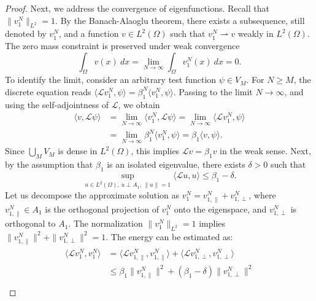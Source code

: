 \documentclass[11pt, a4paper]{article}
\theoremstyle{break}
\theoremstyle{break}
\theoremstyle{break}
\theoremstyle{break}
\theoremstyle{break}
\theoremstyle{break}
\theoremstyle{break}
\theoremstyle{break}
\theoremstyle{break}
\theoremstyle{break}
\begin{document}
\begin{proof}
    Next, we address the convergence of eigenfunctions. Recall that $\|v_1^N\|_{L^2} = 1$. By the Banach-Alaoglu theorem, there exists a subsequence, still denoted by $v_1^N$, and a function $v \in L^2(\Omega)$ such that $v_1^N \rightharpoonup v$ weakly in $L^2(\Omega)$. The zero mass constraint is preserved under weak convergence
    \begin{equation}
        \int_\Omega v(x) \:dx = \lim_{N \to \infty} \int_\Omega v_1^N(x) \:dx = 0.
    \end{equation}
    To identify the limit, consider an arbitrary test function $\psi \in V_M$. For $N \geq M$, the discrete equation reads $\langle \mathcal{L} v_1^N, \psi \rangle = \beta_1^N \langle v_1^N, \psi \rangle$. Passing to the limit $N \to \infty$, and using the self-adjointness of $\mathcal{L}$, we obtain
    \begin{align}
        \langle v, \mathcal{L} \psi \rangle &= \lim_{N \to \infty} \langle v_1^N, \mathcal{L} \psi \rangle = \lim_{N \to \infty} \langle \mathcal{L} v_1^N, \psi \rangle \\
        &= \lim_{N \to \infty} \beta_1^N \langle v_1^N, \psi \rangle = \beta_1 \langle v, \psi \rangle.
    \end{align}
    Since $\bigcup_{M} V_M$ is dense in $L^2(\Omega)$, this implies $\mathcal{L} v = \beta_1 v$ in the weak sense.
    Next, by the assumption that $\beta_1$ is an isolated eigenvalue, there exists $\delta > 0$ such that
    \begin{equation}
        \sup_{u \in L^2(\Omega), \, u \perp A_1, \, \|u\|=1} \langle \mathcal{L} u, u \rangle \leq \beta_1 - \delta.
    \end{equation}
    Let us decompose the approximate solution as $v_1^N = v_{1, \parallel}^{N} + v_{1, \perp}^{N}$, where $v_{1, \parallel}^{N} \in A_1$ is the orthogonal projection of $v_1^N$ onto the eigenspace, and $v_{1, \perp}^{N}$ is orthogonal to $A_1$. The normalization $\|v_1^N\|_{L^2}=1$ implies $\|v_{1, \parallel}^{N}\|^2 + \|v_{1, \perp}^{N}\|^2 = 1$. The energy can be estimated as:
    \begin{align}
        \begin{split}
            \langle \mathcal{L} v_1^N, v_1^N \rangle &= \langle \mathcal{L} v_{1, \parallel}^{N}, v_{1, \parallel}^{N} \rangle + \langle \mathcal{L} v_{1, \perp}^{N}, v_{1, \perp}^{N} \rangle \\
            &\leq \beta_1 \|v_{1, \parallel}^{N}\|^2 + (\beta_1 - \delta) \|v_{1, \perp}^{N}\|^2 \\

\end{split}
\end{align}
\end{proof}
\end{document}
